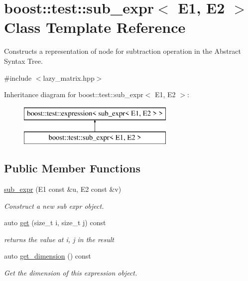 \hypertarget{classboost_1_1test_1_1sub__expr}{}\section{boost\+::test\+::sub\+\_\+expr$<$ E1, E2 $>$ Class Template Reference}
\label{classboost_1_1test_1_1sub__expr}


Constructs a representation of node for subtraction operation in the Abstract Syntax Tree.  




{\ttfamily \#include $<$lazy\+\_\+matrix.\+hpp$>$}

Inheritance diagram for boost\+::test\+::sub\+\_\+expr$<$ E1, E2 $>$\+:\begin{figure}[H]
\begin{center}
\leavevmode
\includegraphics[height=2.000000cm]{classboost_1_1test_1_1sub__expr}
\end{center}
\end{figure}
\subsection*{Public Member Functions}
\begin{DoxyCompactItemize}
\item 
\mbox{\hyperlink{classboost_1_1test_1_1sub__expr_a4f0916c0429686fe13a7d577593b43b6}{sub\+\_\+expr}} (E1 const \&u, E2 const \&v)
\begin{DoxyCompactList}\small\item\em Construct a new sub expr object. \end{DoxyCompactList}\item 
auto \mbox{\hyperlink{classboost_1_1test_1_1sub__expr_ae60478e21c0164c46a0edda336381887}{get}} (size\+\_\+t i, size\+\_\+t j) const
\begin{DoxyCompactList}\small\item\em returns the value at i, j in the result \end{DoxyCompactList}\item 
auto \mbox{\hyperlink{classboost_1_1test_1_1sub__expr_ad9223a7c52f0503f416c5805994f2652}{get\+\_\+dimension}} () const
\begin{DoxyCompactList}\small\item\em Get the dimension of this expression object. \end{DoxyCompactList}\end{DoxyCompactItemize}


